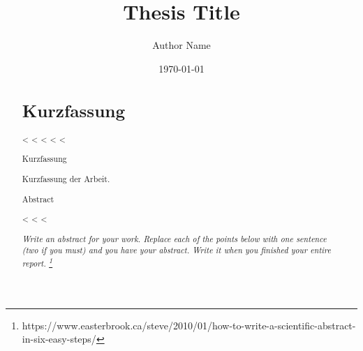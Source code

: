 {{\begin{abstract}
\begin{abstract}
\begin{abstract}
\section*{Kurzfassung}
<%
<%
<%
\frontmatter
<%
<%
\title{Thesis Title}
\author{Author Name}
\date{\today}
\maketitle

\pagestyle{scrheadings}

\chapter*{Kurzfassung}
Kurzfassung der Arbeit.
\clearpage

\chapter*{Abstract}
<%
<%
<%
\begin{otherlanguage}{american}
  \emph{Write an abstract for your work.
    Replace each of the points below with one sentence (two if you must) and you have your abstract.
    Write it when you finished your entire report.%
    \footnote{https://www.easterbrook.ca/steve/2010/01/how-to-write-a-scientific-abstract-in-six-easy-steps/}}


\end{otherlanguage}
\end{abstract}
\end{abstract}
\end{abstract}}}
